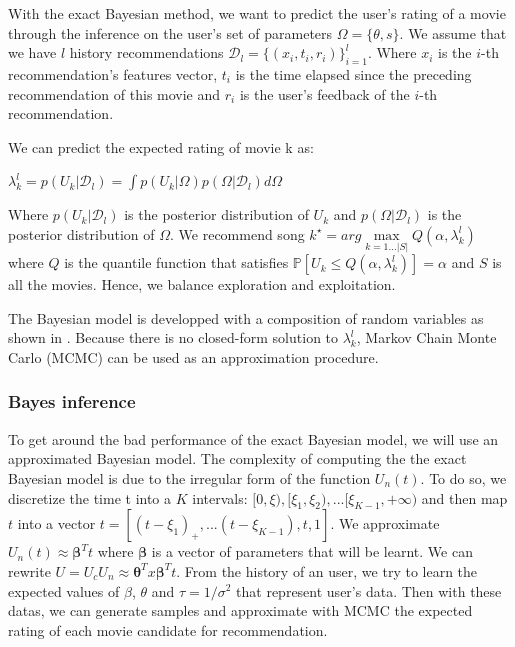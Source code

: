 \documentclass[letterpaper]{article}
\begin{document}
With the exact Bayesian method, we want to predict the user's rating of a movie through the inference on the user's set of parameters $\Omega = \lbrace \theta , s \rbrace $. We assume that we have $l$ history recommendations $ \mathcal{D}_l = \lbrace (x_i, t_i, r_i) \rbrace^l_{i=1}$. Where $x_i$ is the $i$-th recommendation's features vector, $t_i$ is the time elapsed since the preceding recommendation of this movie and $r_i$ is the user's feedback of the $i$-th recommendation.

We can predict the expected rating of movie k as:
\begin{center}
$\lambda^l_k = p(U_k | \mathcal{D}_l) = \int p(U_k|\Omega)p(\Omega| \mathcal{D}_l)d\Omega$
\end{center}
Where $p(U_k|\mathcal{D}_l)$ is the posterior distribution of $U_k$ and $ p(\Omega| \mathcal{D}_l) $ is the posterior distribution of $ \Omega $. We recommend song $k^{\star} = arg \max\limits_{k=1...|S|} Q(\alpha, \lambda^l_k)$ where $Q$ is the quantile function that satisfies $ \mathbb{P} [ U_k \le Q(\alpha, \lambda^l_k) ]=\alpha$ and $S$ is all the movies. 
Hence, we balance exploration and exploitation.

The Bayesian model is developped with a composition of random variables as shown in \cite{main}. Because there is no closed-form solution to $ \lambda^l_k$, Markov Chain Monte Carlo (MCMC) can be used as an approximation procedure.

\subsubsection{Bayes inference}

To get around the bad performance of the exact Bayesian model, we will use an approximated Bayesian model. The complexity of computing the the exact Bayesian model is due to the irregular form of the function $U_n(t)$. To do so, we discretize the time t into a $K$ intervals: $ [0, \xi), [\xi_1,\xi_2),...[\xi_{K-1}, +\infty)$ and then map $t$ into a vector $t = [(t-\xi_1)_{+},...(t-\xi_{K-1}),t,1]$. We approximate $U_n(t) \approx \boldsymbol{\beta}^{T}t $ where $ \boldsymbol{\beta}$ is a vector of parameters that will be learnt. We can rewrite $ U = U_c U_n \approx \boldsymbol{\theta}^{T} x \boldsymbol{\beta}^{T} t $. From the history of an user, we try to learn the expected values of $\beta$, $\theta$ and $\tau = 1/\sigma^2$ that represent user's data. Then with these datas, we can generate samples and approximate with MCMC the expected rating of each movie candidate for recommendation.
\end{document}
